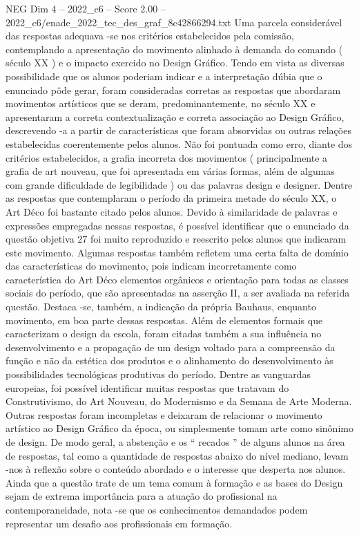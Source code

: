 \begin{textsample}{NEG Dim 4 – 2022\_c6 – Score 2.00 – 2022\_c6/enade\_2022\_tec\_des\_graf\_8c42866294.txt}
Uma parcela considerável das respostas adequava -se nos critérios estabelecidos pela comissão, contemplando a apresentação do movimento alinhado à demanda do comando ( século XX ) e o impacto exercido no Design Gráfico.
Tendo em vista as diversas possibilidade que os alunos poderiam indicar e a interpretação dúbia que o enunciado pôde gerar, foram consideradas corretas as respostas que abordaram movimentos artísticos que se deram, predominantemente, no século XX e apresentaram a correta contextualização e correta associação ao Design Gráfico, descrevendo -a a partir de características que foram absorvidas ou outras relações estabelecidas coerentemente pelos alunos.
Não foi pontuada como erro, diante dos critérios estabelecidos, a grafia incorreta dos movimentos ( principalmente a grafia de art nouveau, que foi apresentada em várias formas, além de algumas com grande dificuldade de legibilidade ) ou das palavras design e designer.
Dentre as respostas que contemplaram o período da primeira metade do século XX, o Art Déco foi bastante citado pelos alunos.
Devido à similaridade de palavras e expressões empregadas nessas respostas, é possível identificar que o enunciado da questão objetiva 27 foi muito reproduzido e reescrito pelos alunos que indicaram este movimento.
Algumas respostas também refletem uma certa falta de domínio das características do movimento, pois indicam incorretamente como característica do Art Déco elementos orgânicos e orientação para todas as classes sociais do período, que são apresentadas na asserção II, a ser avaliada na referida questão.
Destaca -se, também, a indicação da própria Bauhaus, enquanto movimento, em boa parte dessas respostas.
Além de elementos formais que caracterizam o design da escola, foram citadas também a sua influência no desenvolvimento e a propagação de um design voltado para a compreensão da função e não da estética dos produtos e o alinhamento do desenvolvimento às possibilidades tecnológicas produtivas do período.
Dentre as vanguardas europeias, foi possível identificar muitas respostas que tratavam do Construtivismo, do Art Nouveau, do Modernismo e da Semana de Arte Moderna.
Outras respostas foram incompletas e deixaram de relacionar o movimento artístico ao Design Gráfico da época, ou simplesmente tomam arte como sinônimo de design.
De modo geral, a abstenção e os “ recados ” de alguns alunos na área de respostas, tal como a quantidade de respostas abaixo do nível mediano, levam -nos à reflexão sobre o conteúdo abordado e o interesse que desperta nos alunos.
Ainda que a questão trate de um tema comum à formação e as bases do Design sejam de extrema importância para a atuação do profissional na contemporaneidade, nota -se que os conhecimentos demandados podem representar um desafio aos profissionais em formação.

\end{textsample}
